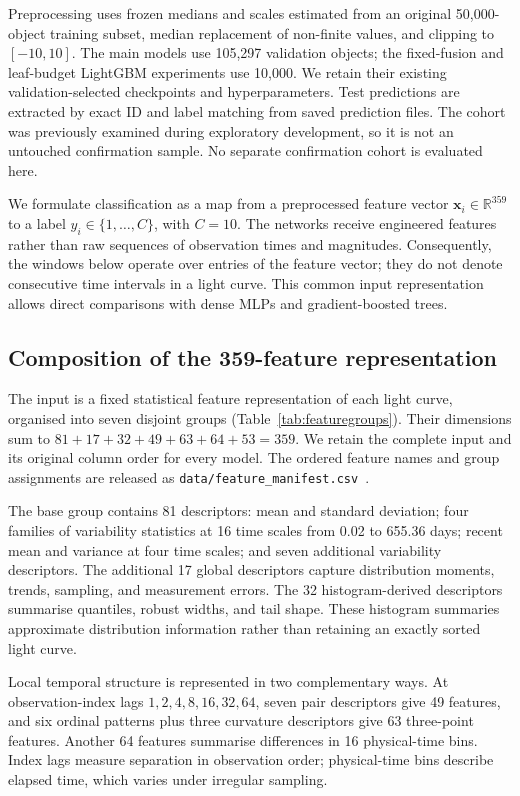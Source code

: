 \documentclass[aps,a4paper,onecolumn,11pt,unpublished]{quantumarticle}
\begin{document}
Preprocessing uses frozen medians and scales estimated from an original 50{,}000-object training subset, median replacement of non-finite values, and clipping to $[-10,10]$. The main models use 105{,}297 validation objects; the fixed-fusion and leaf-budget LightGBM experiments use 10{,}000. We retain their existing validation-selected checkpoints and hyperparameters. Test predictions are extracted by exact ID and label matching from saved prediction files. The cohort was previously examined during exploratory development, so it is not an untouched confirmation sample. No separate confirmation cohort is evaluated here.


We formulate classification as a map from a preprocessed feature vector $\mathbf{x}_i\in\mathbb{R}^{359}$ to a label $y_i\in\{1,\ldots,C\}$, with $C=10$. The networks receive engineered features rather than raw sequences of observation times and magnitudes. Consequently, the windows below operate over entries of the feature vector; they do not denote consecutive time intervals in a light curve. This common input representation allows direct comparisons with dense MLPs and gradient-boosted trees.

\subsection{Composition of the 359-feature representation}

The input is a fixed statistical feature representation of each light curve, organised into seven disjoint groups (Table~\ref{tab:featuregroups}). Their dimensions sum to $81+17+32+49+63+64+53=359$. We retain the complete input and its original column order for every model. The ordered feature names and group assignments are released as \texttt{data/feature\_manifest.csv}~\cite{artifacts}.

The base group contains 81 descriptors: mean and standard deviation; four families of variability statistics at 16 time scales from 0.02 to 655.36 days; recent mean and variance at four time scales; and seven additional variability descriptors. The additional 17 global descriptors capture distribution moments, trends, sampling, and measurement errors. The 32 histogram-derived descriptors summarise quantiles, robust widths, and tail shape. These histogram summaries approximate distribution information rather than retaining an exactly sorted light curve.

Local temporal structure is represented in two complementary ways. At observation-index lags $1,2,4,8,16,32,64$, seven pair descriptors give 49 features, and six ordinal patterns plus three curvature descriptors give 63 three-point features. Another 64 features summarise differences in 16 physical-time bins. Index lags measure separation in observation order; physical-time bins describe elapsed time, which varies under irregular sampling.
\end{document}
